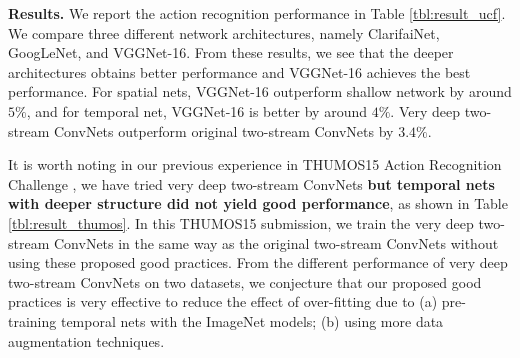 \documentclass[10pt,twocolumn,letterpaper]{article}
\begin{document}
{\bf Results.} We report the action recognition performance in Table \ref{tbl:result_ucf}. We compare three different network architectures, namely ClarifaiNet, GoogLeNet, and VGGNet-16. From these results, we see that the deeper architectures obtains better performance and VGGNet-16 achieves the best performance. For spatial nets, VGGNet-16 outperform shallow network by around $5\%$, and for temporal net, VGGNet-16 is better by around $4\%$. Very deep two-stream ConvNets outperform original two-stream ConvNets by $3.4\%$.

It is worth noting in our previous experience \cite{WangWXQ15} in THUMOS15 Action Recognition Challenge \cite{THUMOS15}, we have tried very deep two-stream ConvNets {\bf but temporal nets with deeper structure did not yield good performance}, as shown in Table \ref{tbl:result_thumos}. In this THUMOS15 submission, we train the very deep two-stream ConvNets in the same way as the original two-stream ConvNets \cite{SimonyanZ14} without using these proposed good practices. From the different performance of very deep two-stream ConvNets on two datasets, we conjecture that our proposed good practices is very effective to reduce the effect of over-fitting due to (a) pre-training temporal nets with the ImageNet models; (b) using more data augmentation techniques.

\begin{table}
\begin{center}
\vspace{2mm}
\caption{Performance comparison with the state of the art on UCF101 dataset.}
\label{tbl:comparison}
\end{center}
\end{table}
\end{document}
